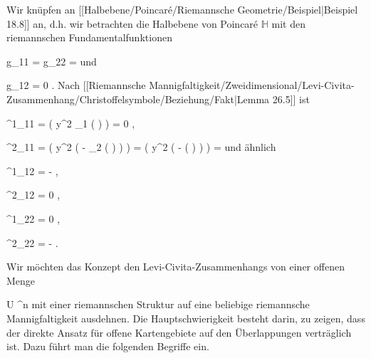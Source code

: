 {

Wir knüpfen an
[[Halbebene/Poincaré/Riemannsche Geometrie/Beispiel|Beispiel 18.8]]
an, d.h. wir betrachten die Halbebene von Poincaré $\mathbb H$  mit den riemannschen Fundamentalfunktionen

\mavergleichskette
{\vergleichskette
{ g_{11}
}
{ = }{ g_{22}
}
{ = }{ {  }
}
{    }{
}
{   }{
}
}
{}{}{}
und

\mavergleichskette
{\vergleichskette
{ g_{12}
}
{ = }{ 0
}
{  }{
}
{    }{
}
{   }{
}
}
{}{}{.}
Nach
[[Riemannsche Mannigfaltigkeit/Zweidimensional/Levi-Civita-Zusammenhang/Christoffelsymbole/Beziehung/Fakt|Lemma 26.5]]
ist

 {  }

\mavergleichskettedisp
{\vergleichskette
{ \Gamma^1_{11}
}
{ =} { {  }  \left(  y^2  \partial_1  \left(  \right)     \right)
}
{ =} { 0
}
{ } {
}
{ } {}
}
{}{}{,}

\mavergleichskettedisp
{\vergleichskette
{ \Gamma^2_{11}
}
{ =} { {  }  \left(  y^2 \left(  - \partial_2  \left(  \right)  \right)      \right)
}
{ =} { {  }  \left(  y^2 \left(  -  \left(  \right)  \right)      \right)
}
{ =} { {  }
}
{ } {
}
}
{}{}{}
und ähnlich

\mavergleichskette
{\vergleichskette
{ \Gamma^1_{12}
}
{ = }{ - {  }
}
{  }{
}
{    }{
}
{   }{
}
}
{}{}{,}

\mavergleichskette
{\vergleichskette
{ \Gamma^2_{12}
}
{ = }{ 0
}
{  }{
}
{    }{
}
{   }{
}
}
{}{}{,}

\mavergleichskette
{\vergleichskette
{ \Gamma^1_{22}
}
{ = }{ 0
}
{  }{
}
{    }{
}
{   }{
}
}
{}{}{,}

\mavergleichskette
{\vergleichskette
{ \Gamma^2_{22}
}
{ = }{ - {  }
}
{  }{
}
{    }{
}
{   }{
}
}
{}{}{.}

}


Wir möchten das Konzept den Levi-Civita-Zusammenhangs von einer offenen Menge

\mavergleichskette
{\vergleichskette
{ U
}
{ \subseteq }{ \R^n
}
{  }{
}
{    }{
}
{   }{
}
}
{}{}{}
mit einer riemannschen Struktur auf eine beliebige riemannsche Mannigfaltigkeit ausdehnen. Die Hauptschwierigkeit besteht darin, zu zeigen, dass der direkte Ansatz für offene Kartengebiete auf den Überlappungen verträglich ist. Dazu führt man die folgenden Begriffe ein.

